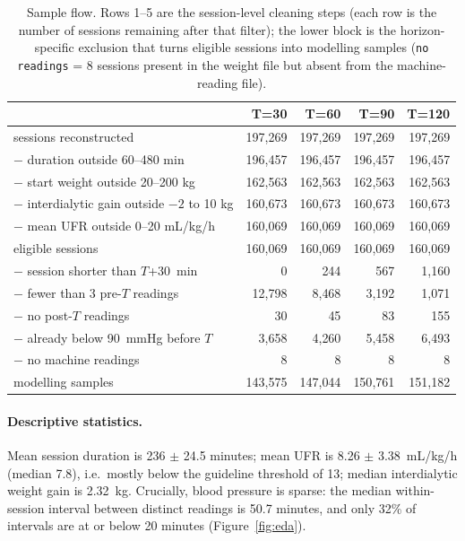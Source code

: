 \documentclass{article}
\begin{document}
\begin{table}[t]
\caption{Sample flow. Rows 1--5 are the session-level cleaning steps (each row is the number of sessions remaining
after that filter); the lower block is the horizon-specific exclusion that turns eligible sessions into modelling samples (\texttt{no readings} = 8 sessions present in the weight file but absent from the
machine-reading file).}
\label{tab:flow}
\centering
\begin{tabular}{lrrrr}
\toprule
& T=30 & T=60 & T=90 & T=120 \\
\midrule
sessions reconstructed & 197{,}269 & 197{,}269 & 197{,}269 & 197{,}269 \\
$-$ duration outside 60--480 min & 196{,}457 & 196{,}457 & 196{,}457 & 196{,}457 \\
$-$ start weight outside 20--200 kg & 162{,}563 & 162{,}563 & 162{,}563 & 162{,}563 \\
$-$ interdialytic gain outside $-2$ to 10 kg & 160{,}673 & 160{,}673 & 160{,}673 & 160{,}673 \\
$-$ mean UFR outside 0--20 mL/kg/h & 160{,}069 & 160{,}069 & 160{,}069 & 160{,}069 \\
\midrule
eligible sessions & 160{,}069 & 160{,}069 & 160{,}069 & 160{,}069 \\
$-$ session shorter than $T$+30~min & 0 & 244 & 567 & 1{,}160 \\
$-$ fewer than 3 pre-$T$ readings & 12{,}798 & 8{,}468 & 3{,}192 & 1{,}071 \\
$-$ no post-$T$ readings & 30 & 45 & 83 & 155 \\
$-$ already below 90~mmHg before $T$ & 3{,}658 & 4{,}260 & 5{,}458 & 6{,}493 \\
$-$ no machine readings & 8 & 8 & 8 & 8 \\
\midrule
modelling samples & 143{,}575 & 147{,}044 & 150{,}761 & 151{,}182 \\
\bottomrule
\end{tabular}
\end{table}

\paragraph{Descriptive statistics.} Mean session duration is 236 $\pm$ 24.5 minutes; mean UFR is 8.26 $\pm$ 3.38~mL/kg/h (median 7.8), i.e.\ mostly below the guideline threshold of 13; median interdialytic weight gain is 2.32~kg. Crucially, blood pressure is sparse: the median within-session interval between distinct readings is 50.7 minutes, and only 32\% of intervals are at or below 20 minutes (Figure~\ref{fig:eda}).
\end{document}
